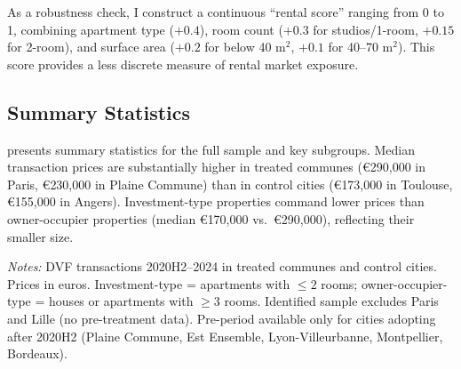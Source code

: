 \documentclass[12pt]{article}
\begin{document}
As a robustness check, I construct a continuous ``rental score'' ranging from 0 to 1, combining apartment type ($+0.4$), room count ($+0.3$ for studios/1-room, $+0.15$ for 2-room), and surface area ($+0.2$ for below 40 m$^2$, $+0.1$ for 40--70 m$^2$). This score provides a less discrete measure of rental market exposure.

\subsection{Summary Statistics}

 presents summary statistics for the full sample and key subgroups. Median transaction prices are substantially higher in treated communes (\euro{290,000} in Paris, \euro{230,000} in Plaine Commune) than in control cities (\euro{173,000} in Toulouse, \euro{155,000} in Angers). Investment-type properties command lower prices than owner-occupier properties (median \euro{170,000} vs.\ \euro{290,000}), reflecting their smaller size.

\begin{table}[H]
\centering
\caption{Summary Statistics}
\label{tab:summary}

\vspace{0.3em}
{\small \emph{Notes:} DVF transactions 2020H2--2024 in treated communes and control cities. Prices in euros. Investment-type = apartments with $\leq 2$ rooms; owner-occupier-type = houses or apartments with $\geq 3$ rooms. Identified sample excludes Paris and Lille (no pre-treatment data). Pre-period available only for cities adopting after 2020H2 (Plaine Commune, Est Ensemble, Lyon-Villeurbanne, Montpellier, Bordeaux).}
\end{table}
\end{document}
